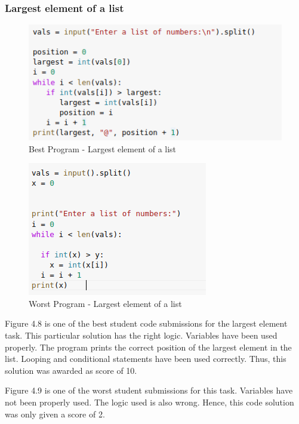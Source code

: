 \newpage

\subsubsection{Largest element of a list}

\begin{figure}[h]
\centering
\includegraphics{./figures/best_la.png}
\caption{Best Program - Largest element of a list}
\label{fig1}
\end{figure}

\begin{figure}[h]
\centering
\includegraphics{./figures/worst_la.png}
\caption{Worst Program - Largest element of a list}
\label{fig1}
\end{figure}

\newpage

Figure 4.8 is one of the best student code submissions for
the largest element task. This particular solution has the
right logic.  Variables have been used properly. The program
prints the correct position of the largest element in the
list. Looping and conditional statements have been used
correctly. Thus, this solution was awarded as score of 10.

Figure 4.9 is one of the worst student submissions for this
task. Variables have not been properly used. The logic used
is also wrong. Hence, this code solution was only given a
score of 2.

